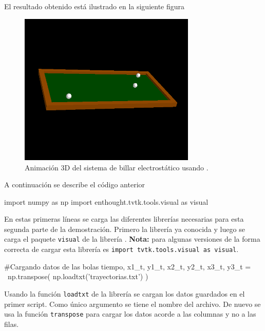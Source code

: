 El resultado obtenido está ilustrado en la siguiente figura


\begin{figure}[htbp]
	\centering
	\includegraphics[width=0.75\textwidth]
	{./pictures/billiards_animated.png}

	\caption{\small{Animación 3D del sistema de billar electrostático 
	usando \mayavi.}}
	
	\label{fig:balls_trayectories_3D}
\end{figure}


A continuación se describe el código anterior


\begin{listing}[style=python, numbers = none]
import numpy as np
import enthought.tvtk.tools.visual as visual
\end{listing}
En estas primeras líneas se carga las diferentes librerías necesarias para
esta segunda parte de la demostración. Primero la librería \numpy ya 
conocida y luego se carga el paquete \texttt{visual} de la librería \mayavi.
\textbf{Nota:} para algunas versiones de \mayavi la forma correcta de 
cargar esta librería es \texttt{import tvtk.tools.visual as visual}.


\begin{listing}[style=python, numbers = none]
#Cargando datos de las bolas
tiempo, x1_t, y1_t, x2_t, y2_t, x3_t, y3_t = \
np.transpose( np.loadtxt('trayectorias.txt') )
\end{listing}
Usando la función \texttt{loadtxt} de la librería \numpy se cargan los 
datos guardados en el primer script. Como único argumento se tiene el 
nombre del archivo. De nuevo se usa la función \texttt{transpose} para 
cargar los datos acorde a las columnas y no a las filas.


